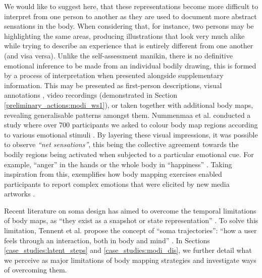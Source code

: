 
We would like to suggest here, that these representations become more difficult to interpret from one person to another as they are used to document more abstract sensations in the body. When considering that, for instance, two persons may be highlighting the same areas, producing illustrations that look very much alike while trying to describe an experience that is entirely different from one another (and visa versa). Unlike the self-assessment manikin, there is no definitive emotional inference to be made from an individual bodily drawing, this is formed by a process of interpretation when presented alongside supplementary information. This may be presented as first-person descriptions, visual annotations \cite{windlin_soma_2019}, video recordings (demonstrated in Section \ref{preliminary_actions:modi_ws1}), or taken together with additional body maps, revealing generalisable patterns amongst them. %
Nummenmaa et al. conducted a study where over 700 participants we asked to colour body map regions according to various emotional stimuli \cite{nummenmaa_bodily_2014}. By layering these visual impressions, it was possible to observe \textit{``net sensations''}, this being the collective agreement towards the bodily regions being activated when subjected to a particular emotional cue. For example, “anger” in the hands or the whole body in “happiness” \cite{davey_where_2021}. Taking inspiration from this, \citeauthor{schino_applying_2021} exemplifies how body mapping exercises enabled participants to report complex emotions that were elicited by new media artworks \cite{schino_applying_2021}.

 Recent literature on soma design has aimed to overcome the temporal limitations of body maps, as “they exist as a snapshot or state representation” \cite{tennent_articulating_2021}. To solve this limitation, Tennent et al. propose the concept of “soma trajectories”: “how a user feels through an interaction, both in body and mind” \cite{tennent_articulating_2021}. In Sections \ref{case_studies:latent_steps} and \ref{case_studies:modi_dis}, we further detail what we perceive as major limitations of body mapping strategies and investigate ways of overcoming them.

